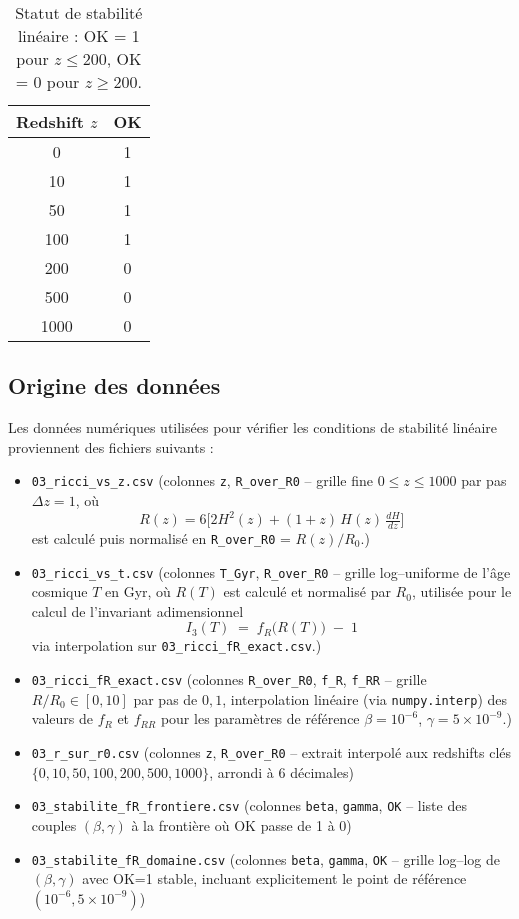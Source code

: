 \begin{table}[htbp]
  \centering
  \begin{tabular}{c c}
    \toprule
    Redshift \(z\) & OK \\
    \midrule
    0    & 1 \\
    10   & 1 \\
    50   & 1 \\
    100  & 1 \\
    200  & 0 \\
    500  & 0 \\
    1000 & 0 \\
    \bottomrule
  \end{tabular}
  \caption{Statut de stabilité linéaire : OK = 1 pour \(z \le 200\), OK = 0 pour \(z \ge 200\).}
  \label{tab:controle_rapide}
\end{table}

\subsection{Origine des données}

Les données numériques utilisées pour vérifier les conditions de stabilité linéaire proviennent des fichiers suivants :

\begin{itemize}
  \item \texttt{03\_ricci\_vs\_z.csv}  
    (colonnes \texttt{z}, \texttt{R\_over\_R0} – grille fine $0\le z\le1000$ par pas $\Delta z=1$,  
    où
    \[
    R(z)=6\bigl[2H^2(z)+(1+z)\,H(z)\,\tfrac{dH}{dz}\bigr]
    \]
    est calculé puis normalisé en \texttt{R\_over\_R0} = \(R(z)/R_0\).)
  \item \texttt{03\_ricci\_vs\_t.csv}  
    (colonnes \texttt{T\_Gyr}, \texttt{R\_over\_R0} – grille log–uniforme de l’âge cosmique $T$ en Gyr, où $R(T)$ est calculé et normalisé par $R_0$, utilisée pour le calcul de l’invariant adimensionnel  
    \[
     I_{3}(T) \;=\; f_{R}\bigl(R(T)\bigr)\;-\;1
    \]
    via interpolation sur \texttt{03\_ricci\_fR\_exact.csv}.)  
  \item \texttt{03\_ricci\_fR\_exact.csv}  
    (colonnes \texttt{R\_over\_R0}, \texttt{f\_R}, \texttt{f\_RR} – grille $R/R_0\in[0,10]$ par pas de $0{,}1$,  
    interpolation linéaire (via \texttt{numpy.interp}) des valeurs de \(f_R\) et \(f_{RR}\)  
     pour les paramètres de référence $\beta=10^{-6}$, $\gamma=5\times10^{-9}$.)
  \item \texttt{03\_r\_sur\_r0.csv}  
    (colonnes \texttt{z}, \texttt{R\_over\_R0} – extrait interpolé aux redshifts clés $\{0,10,50,100,200,500,1000\}$, arrondi à 6 décimales)
  \item \texttt{03\_stabilite\_fR\_frontiere.csv}  
    (colonnes \texttt{beta}, \texttt{gamma}, \texttt{OK} – liste des couples $(\beta,\gamma)$ à la frontière où OK passe de 1 à 0)
  \item \texttt{03\_stabilite\_fR\_domaine.csv}  
    (colonnes \texttt{beta}, \texttt{gamma}, \texttt{OK} – grille log–log de $(\beta,\gamma)$ avec OK=1 stable, incluant explicitement le point de référence $(10^{-6},5\times10^{-9})$)
\end{itemize}

